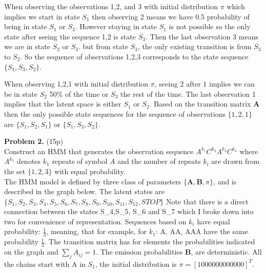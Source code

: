 \documentclass[12pt]{article}
\newcommand{\matr}[1]{\bm{#1}}
\begin{document}
When observing the observations 1,2, and 3 with initial distribution $\pi$ which implies we start in state $S_1$ then observing 2 means we have 0.5 probability of being in state $S_1$ or $S_3$.
However staying in state $S_1$ is not possible so the only state after seeing the sequence 1,2 is state $S_3$. Then the last observation 3 means we are in state $S_2$ or $S_3$. but from state $S_3$, 
the only existing transition is from $S_3$ to $S_2$. So the sequence of observations 1,2,3 corresponds to the state sequence $\{S_1, S_3, S_2 \}$.

When observing 1,2,1 with initial distribution $\pi$, seeing 2 after 1 implies we can be in state $S_2$ 50\% of the time or $S_3$ the rest of the time. The last observation 1 implies that the latent space is either $S_1$ or $S_2$.
Based on the transition matrix $\matr{A}$ then the only possible state sequences for the sequence of observations $\{1,2,1\}$ are $\{S_1, S_2, S_1\}$ or  $\{S_1, S_3, S_2\}$.

\noindent \textbf{Problem 2.} (15p)\\
Construct an HMM that generates the observation sequence $A^{k_1}C^{k_2}A^{k_3}C^{k_4}$ where $A^{k_1}$ denotes $k_1$ repeats of symbol $A$ and the number of repeats $k_i$ are drawn from the set $\{1,2,3\}$ with equal probability.\\

The HMM model is defined by three class of parameters $\{\matr{A}, \matr{B}, \pi \}$, and is described in the graph below. The latent states are $\{S_1, S_2, S_3, S_4, S_5, S_6, S_7, S_8, S_9, S_{10}, S_{11}, S_{12}, STOP\}$
Note that there is a direct connection between the states S\_4,S\_5, S\_6 and S\_7 which I broke down into two for convenience of representation.
Sequences based on $k_i$ have equal probability: $\frac{1}{3}$, meaning, that for example, for $k_1$: A, AA, AAA have the same probability $\frac{1}{3}$.
The transition matrix has for elements the probabilities indicated on the graph and $\sum_{j} A_{ij}=1$.
The emission probabilities $\matr{B}$, are deterministic. All the chains start with A in $S_1$, the initial distribution is $\pi = [1 0 0 0 0 0 0 0 0 0 0 0 0]^T$.
\end{document}
